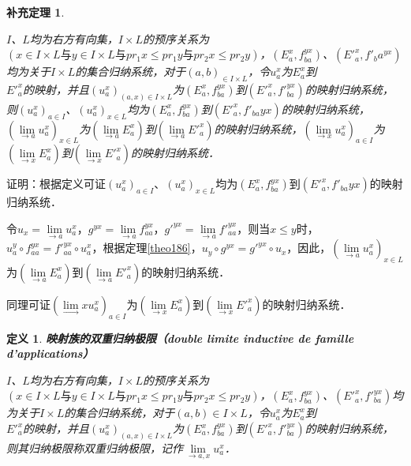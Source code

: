 \documentclass[12pt, a4paper, oneside]{book}
\newtheorem{cor}{补充定理}
\newtheorem{de}{定义}
\begin{document}
			\begin{cor}\label{cor432}
				\hfill\par
				$I$、$L$均为右方有向集，$I\times L$的预序关系为$(x\in I\times L\text{与}y\in I\times L\text{与}pr_1x\leq pr_1y\text{与}pr_2x\leq pr_2y)$，$(E_a^x, f_{ba}^{yx})$、$({E'}_a^x, {f'}_ba^{yx})$均为关于$I\times L$的集合归纳系统，对于$(a, b)_{\in I\times L}$，令$u_a^x$为$E_a^x$到\\${E'}_a^x$的映射，并且$(u_a^x)_{(a, x)\in I\times L}$为$(E_a^x, f_{ba}^{yx})$到$({E'}_a^x, {f'}_{ba}^{yx})$的映射归纳系统，则$(u_a^x)_{a\in I}$、$(u_a^x)_{x\in L}$均为$(E_a^x, f_{ba}^{yx})$到$({E'}_a^x, {f'}_{ba}{yx})$的映射归纳系统，$(\lim\limits_{\to a}u_a^x)_{x\in L}$为$(\lim\limits_{\to a}E_a^x)$到$(\lim\limits_{\to a}{E'}_a^x)$的映射归纳系统，$(\lim\limits_{\to x}u_a^x)_{a\in I}$为$(\lim\limits_{\to x}E_a^x)$到$(\lim\limits_{\to x}{E'}_a^x)$的映射归纳系统．
			\end{cor}
			证明：根据定义可证$(u_a^x)_{a\in I}$、$(u_a^x)_{x\in L}$均为$(E_a^x, f_{ba}^{yx})$到$({E'}_a^x, {f'}_{ba}{yx})$的映射归纳系统．
			\par
			令$u_x=\lim\limits_{\to a}u_a^x$，$g^{yx}=\lim\limits_{\to a}f_{aa}^{yx}$，${g'}^{yx}= \lim\limits_{\to a}{f'}_{aa}^{yx}$，则当$x\leq y$时，$u_a^y\circ f_{aa}^{yx}={f'}_{aa}^{yx}\circ u_a^x$，根据定理\ref{theo186}，$u_y\circ g^{yx}={g'}^{yx}\circ u_x$，因此，$(\lim\limits_{\to a}u_a^x)_{x\in L}$为$(\lim\limits_{\to a}E_a^x)$到$(\lim\limits_{\to a}{E'}_a^x)$的映射归纳系统．
			\par
			同理可证$(\lim\limits_\to xu_a^x)_{a\in I}$为$(\lim\limits_{\to x}E_a^x)$到$(\lim\limits_{\to x}{E'}_a^x)$的映射归纳系统．
			
			\begin{de}
				\textbf{映射族的双重归纳极限（double limite inductive de famille \\d'applications）}
				\par
				$I$、$L$均为右方有向集，$I\times L$的预序关系为$(x\in I\times L\text{与}y\in I\times L\text{与}pr_1x\leq pr_1y\text{与}pr_2x\leq pr_2y)$，$(E_a^x, f_{ba}^{yx})$、$({E'}_a^x, {f'}_{ba}^{yx})$均为关于$I\times L$的集合归纳系统，对于$(a, b)\in I\times L$，令$u_a^x$为$E_a^x$到\\${E'}_a^x$的映射，并且$(u_a^x)_{(a, x)\in I\times L}$为$(E_a^x, f_{ba}^{yx})$到$({E'}_a^x, {f'}_{ba}^{yx})$的映射归纳系统，则其归纳极限称双重归纳极限，记作$\lim\limits_{\to a, x}u_a^x$．
			\end{de}
					
\end{document}
